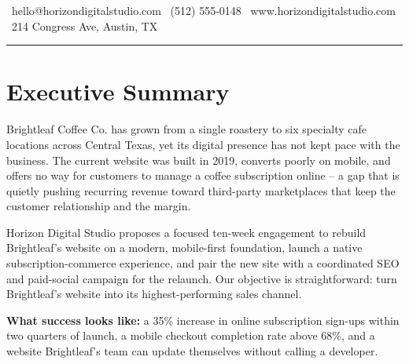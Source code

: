 \documentclass[11pt]{article}
\begin{document}
\vspace{1.2em}
\noindent
\small\color{softgray}
\faEnvelope\ hello@horizondigitalstudio.com \quad
\faPhone\ (512) 555-0148 \quad
\faGlobe\ www.horizondigitalstudio.com \quad
\faMapMarker\ 214 Congress Ave, Austin, TX

\vspace{4pt}
{\color{accent2}\rule{\linewidth}{0.6pt}}

\clearpage

\section{Executive Summary}

Brightleaf Coffee Co. has grown from a single roastery to six specialty cafe locations across
Central Texas, yet its digital presence has not kept pace with the business. The current website
was built in 2019, converts poorly on mobile, and offers no way for customers to manage a coffee
subscription online -- a gap that is quietly pushing recurring revenue toward third-party
marketplaces that keep the customer relationship and the margin.

Horizon Digital Studio proposes a focused ten-week engagement to rebuild Brightleaf's website on
a modern, mobile-first foundation, launch a native subscription-commerce experience, and pair the
new site with a coordinated SEO and paid-social campaign for the relaunch. Our objective is
straightforward: turn Brightleaf's website into its highest-performing sales channel.

\begin{tcolorbox}[noteboxstyle]
  \textbf{\color{accent}What success looks like:} a 35\% increase in online subscription
  sign-ups within two quarters of launch, a mobile checkout completion rate above 68\%, and
  a website Brightleaf's team can update themselves without calling a developer.
\end{tcolorbox}
\end{document}

